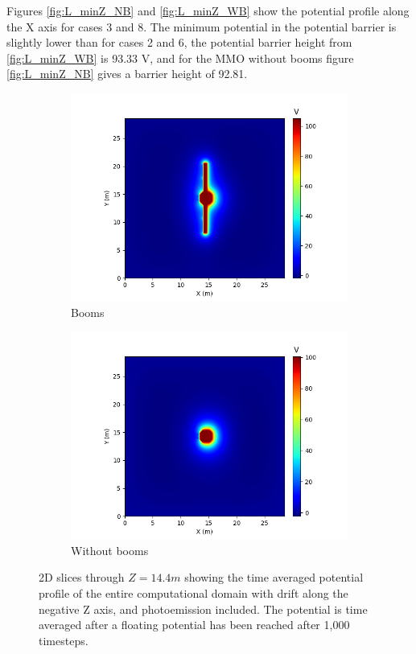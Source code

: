 Figures \ref{fig:L_minZ_NB} and \ref{fig:L_minZ_WB} show the potential profile along the X axis for cases 3 and 8. The minimum potential in the potential barrier is slightly lower than for cases 2 and 6, the potential barrier height from \ref{fig:L_minZ_WB} is 93.33 V, and for the MMO without booms figure \ref{fig:L_minZ_NB} gives a barrier height of 92.81.

\begin{figure}[H]
  \begin{subfigure}[b]{0.6\textwidth}
    \includegraphics[width=\textwidth]{figures/MMO/minZ/WB/P_minZ_WB.png}
    \caption{Booms}
    \label{fig:P_minZ_WB}
  \end{subfigure}
  \hfill
  \begin{subfigure}[b]{0.6\textwidth}
    \includegraphics[width=\textwidth]{figures/MMO/minZ/NB/P_minZ_NB.png}
    \caption{Without booms}
    \label{fig:P_minZ_NB}
  \end{subfigure}
  \caption{2D slices through $Z = 14.4 m$ showing the time averaged potential profile of the entire computational domain with drift along the negative Z axis, and photoemission included. The potential is time averaged after a floating potential has been reached after 1,000 timesteps.}
\label{fig:Pot_minZ}
\end{figure}


